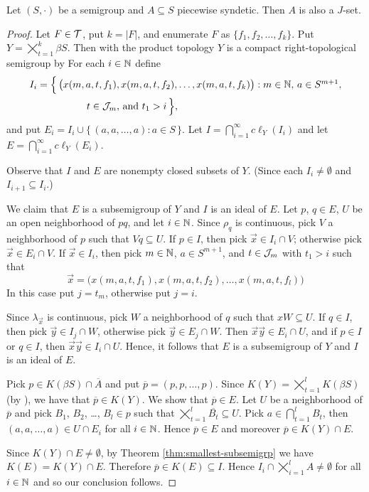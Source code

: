 \begin{thm}
  Let $(S, \cdot)$ be a semigroup and $A \subseteq S$ piecewise syndetic.
  Then $A$ is also a $J$-set.
\end{thm}
\begin{proof}
  Let $F \in \mathcal{T}$, put $k = |F|$, and enumerate $F$ as $\{f_1, f_2, \ldots, f_k\}$.
  Put $Y = \bigtimes_{t=1}^k \beta S$. 
  Then with the product topology $Y$ is a compact right-topological semigroup by \cite[Theorem 2.22]{Hindman:1998fk}
  For each $i \in \mathbb{N}$ define
  \begin{align*}
    I_i &= \Bigl\{\, \bigl( x(m, a, t, f_1), x(m, a, t, f_2), \ldots,
    x(m, a, t, f_k) \bigr) : \mbox{$m \in \mathbb{N}$, $a \in S^{m+1}$,} \\
    &\hspace{5em} \mbox{$t \in \mathcal{J}_m$, and $t_1 > i$}
    \,\Bigr\},
  \end{align*}
  and put $E_i = I_i \cup \{\, (a, a, \ldots, a) : a \in S \,\}$.
  Let $I = \bigcap_{i=1}^\infty c\ell_Y(I_i)$ and let $E = \bigcap_{i=1}^\infty c\ell_Y(E_i)$.

  Observe that $I$ and $E$ are nonempty closed subsets of $Y$.
  (Since each $I_i \ne \emptyset$ and $I_{i+1} \subseteq I_i$.)

  We claim that $E$ is a subsemigroup of $Y$ and $I$ is an ideal of $E$.
  Let $p$, $q \in E$, $U$ be an open neighborhood of $pq$, and let $i \in \mathbb{N}$. 
  Since $\rho_q$ is continuous, pick $V$ a neighborhood of $p$ such that $Vq \subseteq U$. 
  If $p \in I$, then pick $\vec{x} \in I_i \cap V$; otherwise pick $\vec{x} \in E_i \cap V$.
  If $\vec{x} \in I_i$, then pick $m \in \mathbb{N}$, $a \in S^{m+1}$, and $t \in \mathcal{J}_m$ with $t_1 > i$ such that
  \[
    \vec{x} = \bigl( x(m, a, t, f_1), x(m, a, t, f_2), \ldots, x(m,
    a, t, f_l) \bigr)
  \]
  In this case put $j = t_m$, otherwise put $j=i$. 

  Since $\lambda_{\vec{x}}$ is continuous, pick $W$ a neighborhood of $q$ such that $xW \subseteq U$. 
  If $q \in I$, then pick $\vec{y} \in I_j \cap W$, otherwise pick $\vec{y} \in E_j \cap W$.
  Then $\vec{x} \vec{y} \in E_i \cap U$, and if $p \in I$ or $q \in I$, then $\vec{x} \vec{y} \in I_i \cap U$. 
  Hence, it follows that $E$ is a subsemigroup of $Y$ and $I$ is an ideal of $E$.

  Pick $p \in K(\beta S) \cap \overline{A}$ and put $\overline{p} = (p, p, \ldots, p)$. 
  Since $K(Y) = \bigtimes_{t=1}^l K(\beta S)$ (by \cite[Theorem 2.23]{Hindman:1998fk}), we have that $\overline{p} \in K(Y)$. 
  We show that $\overline{p} \in E$.
  Let $U$ be a neighborhood of $\overline{p}$ and pick $B_1$, $B_2$, \dots, $B_l \in p$ such that $\bigtimes_{t=1}^l \overline{B_t} \subseteq U$. 
  Pick $a \in \bigcap_{t=1}^l B_t$, then $(a, a, \ldots, a) \in U \cap E_i$ for all $i \in \mathbb{N}$. 
  Hence $\overline{p} \in E$ and moreover $\overline{p} \in K(Y) \cap E$.

  Since $K(Y) \cap E \ne \emptyset$, by Theorem \ref{thm:smallest-subsemigrp} we have $K(E) = K(Y) \cap E$.
  Therefore $\overline{p} \in K(E) \subseteq I$.
  Hence $I_i \cap \bigtimes_{i=1}^l A \ne \emptyset$ for all $i \in \mathbb{N}$ and so our conclusion follows.
\end{proof}

